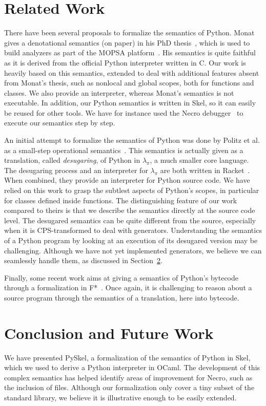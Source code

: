 \documentclass[submission,copyright,creativecommons]{eptcs}
\begin{document}
\section{Related Work}\label{sec:related}
There have been several proposals to formalize the semantics of Python. Monat gives a denotational
semantics (on paper) in his PhD thesis~\cite{Monat2021}, which is used to build analyzers
as part of the MOPSA platform~\cite{MonatOuadjaoutMine2021}. His semantics is quite faithful as it
is derived from the official Python interpreter written in C. Our work is
heavily based on this semantics, extended to deal with additional features
absent from Monat's thesis, such as nonlocal and global scopes, both for
functions and classes. We also provide
an interpreter, whereas Monat's semantics is not executable. In addition, our
Python semantics is written in Skel, so it can easily be reused for other tools.
We have for instance used the Necro debugger~\cite{necrodebug} to execute our semantics
step by step.

An initial attempt to formalize the semantics of Python was done by Politz et
al. as a small-step operational
semantics~\cite{PolitzMartinezMilanoWarrenPattersonLiChitipothuKrishnamurthi2013}.
This semantics is actually given as a translation, called \emph{desugaring}, of Python in
\(\lambda_{\pi}\), a much smaller core language. The desugaring process and an interpreter for \(\lambda_{\pi}\)
are both written in Racket~\cite{FelleisenFindlerFlattKrishnamurthiBarzilayMcCarthyTobin-Hochstadt2018}. When combined, they provide an
interpreter for Python source code. We have relied on this work to
grasp the subtlest aspects of Python's scopes, in particular for classes defined
inside functions. The distinguishing feature of our work compared to theirs is
that we describe the semantics directly at the source code level. The desugared
semantics can be quite different from the source, especially when it is
CPS-transformed to deal with generators. Understanding the semantics of a Python
program by looking at an execution of its desugared version may be challenging.
Although we have not yet implemented generators, we believe we can seamlessly
handle them, as discussed in Section~\ref{sec:conclusion}.

Finally, some recent work aims at giving a semantics of Python's bytecode
through a formalization in F*~\cite{Karkour2022}. Once again, it is challenging
to reason about a source program through the semantics of a translation, here
into bytecode.

\section{Conclusion and Future Work}\label{sec:conclusion}
We have presented PySkel, a formalization of the semantics of Python in Skel, which we used
to derive a Python interpreter in OCaml. The development of this complex
semantics has helped identify areas of improvement for Necro, such as the
inclusion of files. Although our formalization only cover a tiny subset of the
standard library, we believe it is illustrative enough to be easily extended.
\end{document}
